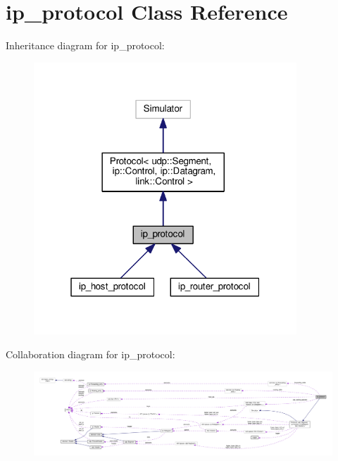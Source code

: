 \hypertarget{classip__protocol}{}\section{ip\+\_\+protocol Class Reference}
\label{classip__protocol}


Inheritance diagram for ip\+\_\+protocol\+:\nopagebreak
\begin{figure}[H]
\begin{center}
\leavevmode
\includegraphics[width=280pt]{classip__protocol__inherit__graph}
\end{center}
\end{figure}


Collaboration diagram for ip\+\_\+protocol\+:\nopagebreak
\begin{figure}[H]
\begin{center}
\leavevmode
\includegraphics[width=350pt]{classip__protocol__coll__graph}
\end{center}
\end{figure}
